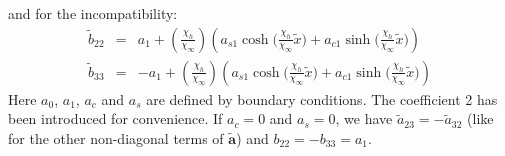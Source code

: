 \documentclass[
10pt, %
a4paper, %
oneside, %
headinclude,footinclude, %
table
]{scrartcl}
\begin{document}
and for the incompatibility:
$$
\begin{array}{rcl}
\tilde{b}_{22}&=&a_{1}+(\frac{\chi_{h}}{\chi_{\infty}})\left(a_{s1}\cosh{(\frac{\chi_{h}}{\chi_{\infty}}\tilde{x}})+a_{c1}\sinh{(\frac{\chi_{h}}{\chi_{\infty}}\tilde{x}})\right)\\
\tilde{b}_{33}&=&-a_{1}+(\frac{\chi_{h}}{\chi_{\infty}})\left(a_{s1}\cosh{(\frac{\chi_{h}}{\chi_{\infty}}\tilde{x}})+a_{c1}\sinh{(\frac{\chi_{h}}{\chi_{\infty}}\tilde{x}})\right)
\end{array}
$$
Here $a_{0}$, $a_{1}$, $a_{c}$ and $a_{s}$ are defined by boundary conditions. The coefficient 2 has been introduced for convenience.  If $a_{c}=0$ and $a_{s}=0$, we have $\tilde{a}_{23}=-\tilde{a}_{32}$ (like for the other non-diagonal terms of $\tilde{\boldsymbol{a}}$) and $b_{22}=-b_{33}=a_{1}$. 

\end{document}
